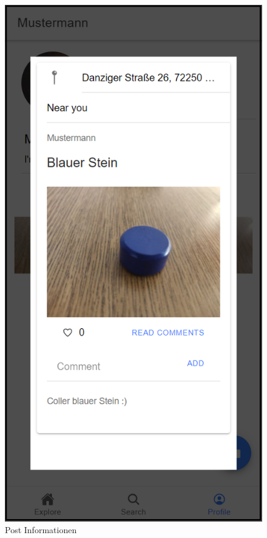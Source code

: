 \begin{figure}[H]
\begin{minipage}{.5\textwidth}
      \includegraphics[width=.6\linewidth]{images/post_info.png}
      \caption{Post Informationen}
      \label{fig:post_info}
    \end{minipage}
\end{figure}

